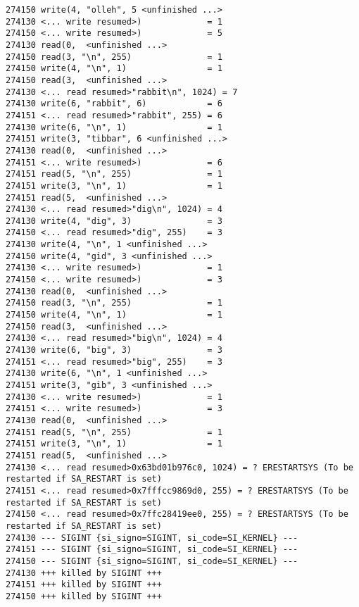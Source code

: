 \begin{verbatim}
274150 write(4, "olleh", 5 <unfinished ...>
274130 <... write resumed>)             = 1
274150 <... write resumed>)             = 5
274130 read(0,  <unfinished ...>
274150 read(3, "\n", 255)               = 1
274150 write(4, "\n", 1)                = 1
274150 read(3,  <unfinished ...>
274130 <... read resumed>"rabbit\n", 1024) = 7
274130 write(6, "rabbit", 6)            = 6
274151 <... read resumed>"rabbit", 255) = 6
274130 write(6, "\n", 1)                = 1
274151 write(3, "tibbar", 6 <unfinished ...>
274130 read(0,  <unfinished ...>
274151 <... write resumed>)             = 6
274151 read(5, "\n", 255)               = 1
274151 write(3, "\n", 1)                = 1
274151 read(5,  <unfinished ...>
274130 <... read resumed>"dig\n", 1024) = 4
274130 write(4, "dig", 3)               = 3
274150 <... read resumed>"dig", 255)    = 3
274130 write(4, "\n", 1 <unfinished ...>
274150 write(4, "gid", 3 <unfinished ...>
274130 <... write resumed>)             = 1
274150 <... write resumed>)             = 3
274130 read(0,  <unfinished ...>
274150 read(3, "\n", 255)               = 1
274150 write(4, "\n", 1)                = 1
274150 read(3,  <unfinished ...>
274130 <... read resumed>"big\n", 1024) = 4
274130 write(6, "big", 3)               = 3
274151 <... read resumed>"big", 255)    = 3
274130 write(6, "\n", 1 <unfinished ...>
274151 write(3, "gib", 3 <unfinished ...>
274130 <... write resumed>)             = 1
274151 <... write resumed>)             = 3
274130 read(0,  <unfinished ...>
274151 read(5, "\n", 255)               = 1
274151 write(3, "\n", 1)                = 1
274151 read(5,  <unfinished ...>
274130 <... read resumed>0x63bd01b976c0, 1024) = ? ERESTARTSYS (To be restarted if SA_RESTART is set)
274151 <... read resumed>0x7fffcc9869d0, 255) = ? ERESTARTSYS (To be restarted if SA_RESTART is set)
274150 <... read resumed>0x7ffc28419ee0, 255) = ? ERESTARTSYS (To be restarted if SA_RESTART is set)
274130 --- SIGINT {si_signo=SIGINT, si_code=SI_KERNEL} ---
274151 --- SIGINT {si_signo=SIGINT, si_code=SI_KERNEL} ---
274150 --- SIGINT {si_signo=SIGINT, si_code=SI_KERNEL} ---
274130 +++ killed by SIGINT +++
274151 +++ killed by SIGINT +++
274150 +++ killed by SIGINT +++
\end{verbatim}
